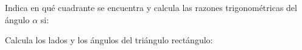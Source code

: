 \documentclass[addpoints,spanish, 12pt,a4paper]{exam}
\begin{document}
\begin{questions}
\question Indica en qué cuadrante se encuentra y calcula las razones trigonométricas del ángulo $\alpha$ si: 



\question Calcula los lados y los ángulos del triángulo rectángulo:
\begin{parts} 

\end{parts}
\end{questions}
\end{document}
